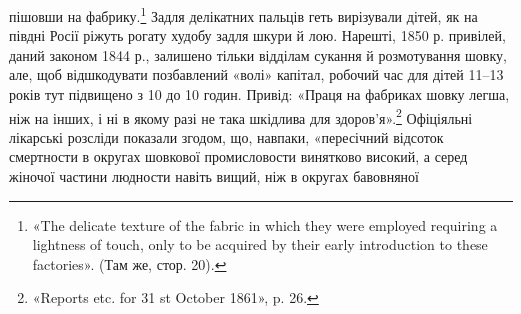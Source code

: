 \parcont{}  %
пішовши на фабрику.\footnote{
«The delicate texture of the fabric in which they were employed
requiring a lightness of touch, only to be acquired by their early introduction
to these factories». (Там же, стор. 20).
} Задля делікатних пальців геть вирізували
дітей, як на півдні Росії ріжуть рогату худобу задля шкури
й лою. Нарешті, 1850 р. привілей, даний законом 1844 р., залишено
тільки відділам сукання й розмотування шовку, але, щоб
відшкодувати позбавлений «волі» капітал, робочий час для дітей
11--13 років тут підвищено з 10 до 10 годин. Привід: «Праця
на фабриках шовку легша, ніж на інших, і ні в якому разі не така
шкідлива для здоров’я».\footnote{
«Reports etc. for 31 st October 1861», p. 26.
} Офіціяльні лікарські розсліди показали
згодом, що, навпаки, «пересічний відсоток смертности в
округах шовкової промисловости винятково високий, а серед жіночої
частини людности навіть вищий, ніж в округах бавовняної
